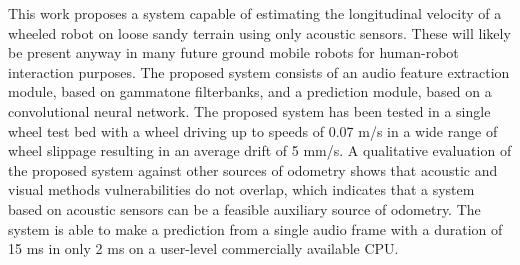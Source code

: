 This work proposes a system capable of estimating the longitudinal velocity of
a wheeled robot on loose sandy terrain using only acoustic sensors. These will
likely be present anyway in many future ground mobile robots for human-robot
interaction purposes. The proposed system consists of an audio feature
extraction module, based on gammatone filterbanks, and a prediction module,
based on a convolutional neural network. The proposed system has been tested in
a single wheel test bed with a wheel driving up to speeds of 0.07 m/s in a wide
range of wheel slippage resulting in an average drift of 5 mm/s. A qualitative
evaluation of the proposed system against other sources of odometry shows that
acoustic and visual methods vulnerabilities do not overlap, which indicates
that a system based on acoustic sensors can be a feasible auxiliary source of
odometry. The system is able to make a prediction from a single audio frame
with a duration of 15 ms in only 2 ms on a user-level commercially available
CPU.